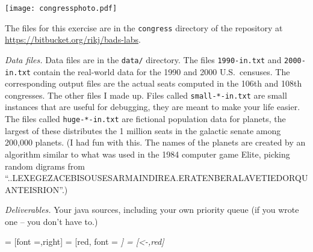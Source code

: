\documentclass[9pt]{memoir}
\begin{document}
\begin{multicols}{2}
\noindent
\texttt{[image: congressphoto.pdf]}



\end{multicols}


\noindent The files for this exercise are in the \texttt{congress}
directory of the repository at \url{https://bitbucket.org/rikj/bads-labs}.

\bigskip
\noindent
\emph{Data files.}
Data files are in the \texttt{data/} directory.
The files \texttt{1990-in.txt} and \texttt{2000-in.txt} contain the real-world data
for the 1990 and 2000 U.S.\ censuses.
The corresponding output files are the actual seats computed in the
106th and 108th congresses.
The other files I made up.
Files called \texttt{small-*-in.txt} are small instances that are useful for
debugging, they are meant to make your life easier.
The files called \texttt{huge-*-in.txt} are fictional population data for
planets, the largest of these distributes the 1 million seats in the
galactic senate among 200,000 planets.
(I had fun with this.
The names of the planets are created by an algorithm similar to what
was used in the 1984 computer game Elite, picking random digrams from
``..LEXEGEZACEBISOUSESARMAINDIREA.ERATENBERALAVETIEDORQUANTEISRION''.)

\bigskip\noindent
\emph{Deliverables.}
Your java sources, 
including your own priority queue (if you wrote one -- you don't have to.)


 = [font =\ttfamily,right]
 = [red, font = \itshape]
 = [<-,red]
\end{document}
